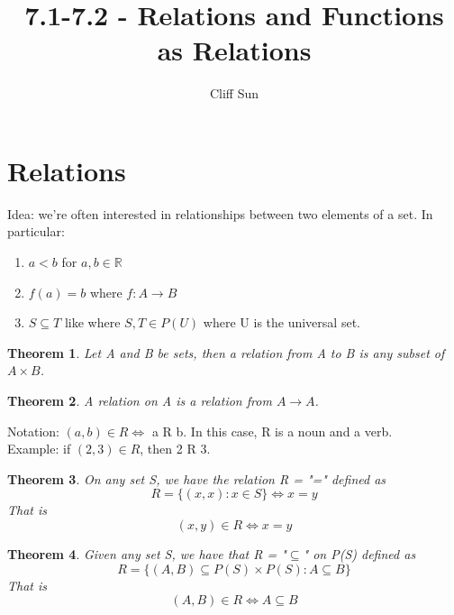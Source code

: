 \documentclass{article}
\title{7.1-7.2 - Relations and Functions as Relations}
\author{Cliff Sun}
\newtheorem{theorem}{Theorem}[section]
\begin{document}
\maketitle

\section*{Relations}

Idea: we're often interested in relationships between two elements of a set. In particular:

\begin{enumerate}
    \item $a < b$ for $a,b \in \mathbb{R}$
    \item $f(a) = b$ where $f: A \rightarrow B$
    \item $S \subseteq T$ like where $S, T \in P(U)$ where U is the universal set. 
\end{enumerate}

\begin{theorem}
    Let A and B be sets, then a relation from A to B is any subset of $A \times B$.
\end{theorem}

\begin{theorem}
    A relation on A is a relation from $A \rightarrow A$.
\end{theorem}

Notation: $(a,b) \in R \iff$ a R b. In this case, R is a noun and a verb. \\

Example: if $(2,3) \in R$, then 2 R 3.

\begin{theorem}
    On any set S, we have the relation R = "=" defined as 
    \begin{equation}
        R = \{(x,x): x \in S\} \iff x = y
    \end{equation}
    That is 
    \begin{equation}
        (x,y) \in R \iff x = y
    \end{equation}
\end{theorem}

\begin{theorem}
    Given any set S, we have that R = "$\subseteq$" on P(S) defined as 
    \begin{equation}
        R = \{(A,B) \subseteq P(S) \times P(S): A \subseteq B\}
    \end{equation}
    That is 
    \begin{equation}
        (A,B) \in R \iff A \subseteq B
    \end{equation}
\end{theorem}
\end{document}
